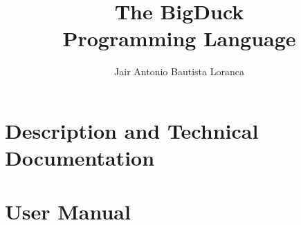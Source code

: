 \documentclass{report}
\title{The BigDuck\\Programming Language}
\author{Jair  Antonio Bautista Loranca}
\begin{document}
\maketitle
\tableofcontents

\part{Description and Technical Documentation}








\part{User Manual}


\end{document}
